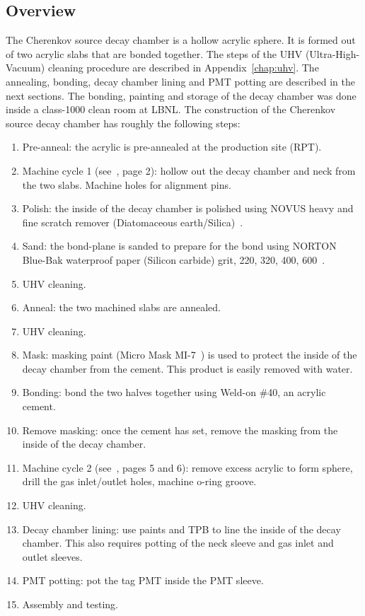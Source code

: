 \subsection{Overview}
The Cherenkov source decay chamber is a hollow acrylic sphere. It is formed out of two acrylic slabs that are bonded together. The steps of the UHV (Ultra-High-Vacuum) cleaning procedure are described in Appendix~\ref{chap:uhv}. The annealing, bonding, decay chamber lining and PMT potting are described in the next sections. The bonding, painting and storage of the decay chamber was done inside a class-1000 clean room at LBNL.
The construction of the Cherenkov source decay chamber has roughly the following steps:
\begin{enumerate}
    \item Pre-anneal: the acrylic is pre-annealed at the production site (RPT).
    \item Machine cycle 1 (see~\cite{wallig:2015}, page 2): hollow out the decay chamber and neck from the two slabs. Machine holes for alignment pins. 
    \item Polish: the inside of the decay chamber is polished using NOVUS heavy and fine scratch remover (Diatomaceous earth/Silica)~\cite{polish}. 
    \item Sand: the bond-plane is sanded to prepare for the bond using NORTON Blue-Bak waterproof paper (Silicon carbide) grit, 220, 320, 400, 600~\cite{sand}.
    \item UHV cleaning.
    \item Anneal: the two machined slabs are annealed.
    \item UHV cleaning.
    \item Mask: masking paint (Micro Mask MI-7~\cite{masking}) is used to protect the inside of the decay chamber from the cement. This product is easily removed with water.
    \item Bonding: bond the two halves together using Weld-on \#40, an acrylic cement. 
    \item Remove masking: once the cement has set, remove the masking from the inside of the decay chamber.
    \item Machine cycle 2 (see~\cite{wallig:2015}, pages 5 and 6): remove excess acrylic to form sphere, drill the gas inlet/outlet holes, machine o-ring groove.
    \item UHV cleaning.
    \item Decay chamber lining: use paints and TPB to line the inside of the decay chamber. This also requires potting of the neck sleeve and gas inlet and outlet sleeves.
    \item PMT potting: pot the tag PMT inside the PMT sleeve.
    \item Assembly and testing.
\end{enumerate}

